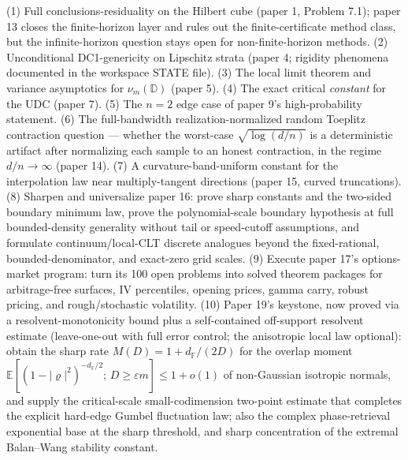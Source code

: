 \documentclass[11pt]{article}
\newcommand{\F}{\mathbb{F}}
\begin{document}
(1) Full conclusions-residuality on the Hilbert cube (paper 1, Problem 7.1);
paper 13 closes the finite-horizon layer and rules out the finite-certificate
method class, but the infinite-horizon question stays open for non-finite-horizon
methods.  (2) Unconditional DC1-genericity on Lipschitz strata (paper 4; rigidity
phenomena documented in the workspace STATE file).  (3) The local limit
theorem and variance asymptotics for $\nu_m(\mathbb D)$ (paper 5).  (4) The
exact critical \emph{constant} for the UDC (paper 7).  (5) The $n=2$ edge case
of paper 9's high-probability statement.  (6) The full-bandwidth
realization-normalized random Toeplitz contraction question --- whether the
worst-case $\sqrt{\log(d/n)}$ is a deterministic artifact after normalizing each
sample to an honest contraction, in the regime \(d/n\to\infty\) (paper 14).
(7) A curvature-band-uniform constant for the
interpolation law near multiply-tangent directions (paper 15, curved
truncations).  (8) Sharpen and universalize paper 16: prove sharp constants and
the two-sided boundary minimum law, prove the polynomial-scale boundary
hypothesis at full bounded-density generality without tail or speed-cutoff
assumptions, and formulate continuum/local-CLT discrete analogues beyond the
fixed-rational, bounded-denominator, and exact-zero grid scales.  (9) Execute
paper 17's options-market program: turn its 100 open problems into solved
theorem packages for arbitrage-free surfaces, IV percentiles, opening prices,
gamma carry, robust pricing, and rough/stochastic volatility.  (10) Paper 19's
keystone, now proved via a resolvent-monotonicity bound plus a self-contained
off-support resolvent estimate (leave-one-out with full error control; the
anisotropic local law optional): obtain the sharp rate $M(D)=1+d_\F/(2D)$ for the overlap moment
$\mathbb E[(1-|\varrho|^2)^{-d_\F/2};\,D\ge\varepsilon m]\le1+o(1)$ of non-Gaussian
isotropic normals, and supply the critical-scale small-codimension two-point estimate
that completes the explicit hard-edge Gumbel fluctuation law; also the complex phase-retrieval exponential base
at the sharp threshold, and sharp concentration of the extremal Balan--Wang
stability constant.
\end{document}
